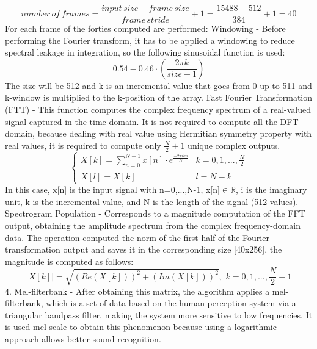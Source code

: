 \begin{equation}
    number\,of\,frames=\frac{input\,size-frame\,size}{frame\,stride}+1=\frac{15488-512}{384}+1=40
\end{equation}
For each frame of the forties computed are performed: Windowing - Before performing the Fourier transform, it has to be applied a windowing to reduce spectral leakage in integration, so the following sinusoidal function is used:\newline
\begin{equation}
    0.54-0.46\cdot(\frac{2\pi k}{size-1})
\end{equation}
The size will be 512 and k is an incremental value that goes from 0 up to 511 and k-window is multiplied to the k-position of the array. Fast Fourier Transformation (FTT) - This function computes the complex frequency spectrum of a real-valued signal captured in the time domain. It is not required to compute all the DFT domain, because dealing with real value using Hermitian symmetry property with real values, it is required to compute only $\frac{N}{2}+1$ unique complex outputs. 
\begin{equation}
    \begin{cases} 
        X[k]=\sum_{n=0}^{N-1}x[n]\cdot e^{\frac{-2\pi ikn}{N}} & k=0,1,...,\frac{N}{2}\\
        X[l]=\overline{X[k]} & l=N-k
    \end{cases}
\end{equation}
In this case, x[n] is the input signal with n=0,...,N-1, x[n]$\in\mathbb{R}$, i is the imaginary unit, k is the incremental value, and N is the length of the signal (512 values). Spectrogram Population - Corresponds to a magnitude computation of the FFT output, obtaining the amplitude spectrum from the complex frequency-domain data. The operation computed the norm of the first half of the Fourier transformation output and saves it in the corresponding size [40x256], the magnitude is computed as follows:
\begin{equation}
    |X[k]|=\sqrt{(Re(X[k]))^2+(Im(X[k]))^2},\,\,k=0,1,...,\frac{N}{2}-1
\end{equation} 
4. Mel-filterbank - After obtaining this matrix, the algorithm applies a mel-filterbank, which is a set of data based on the human perception system via a triangular bandpass filter, making the system more sensitive to low frequencies. It is used mel-scale to obtain this phenomenon because using a logarithmic approach allows better sound recognition.\newline
